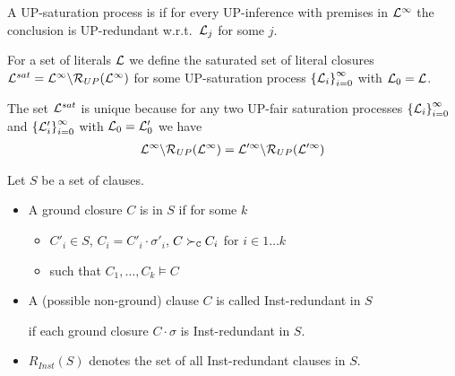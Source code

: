    \begin{definition}[UP-Fairness]

            A UP-saturation process is  if for every UP-inference
            with premises in \( \mathcal{L}^\infty \) the conclusion is UP-redundant
            w.r.t.~\( \mathcal{L}_j \) for some \( j \).
   \end{definition}
   \begin{definition}

            For a set of literals \( \mathcal{L} \) we define
            the saturated set of literal closures
           \( \mathcal{L}^{sat} = \mathcal{L}^\infty\backslash\mathcal{R}_{UP}(\mathcal{L}^\infty) \)
            for some UP-saturation process
           \( {\{ \mathcal{L}_i \}}_{i=0}^\infty \)
            with \( \mathcal{L}_0 = \mathcal{L} \).
   \end{definition}


       \begin{lemma}
        The set \( \mathcal{L}^{sat} \) is unique because
        for any two UP-fair saturation processes
        \( {\{ \mathcal{L}_i \}}_{i=0}^\infty \) and
        \( {\{ \mathcal{L}'_i \}}_{i=0}^\infty \)
        with \( \mathcal{L}_0 = \mathcal{L}'_0 \) we have
        \begin{gather*}
            \mathcal{L}^\infty \backslash \mathcal{R}_{UP}(\mathcal{L}^\infty)
            =
            \mathcal{L}'^\infty \backslash \mathcal{R}_{UP}(\mathcal{L}'^\infty)
        \end{gather*}
       \end{lemma}

\begin{definition}\label{def:inst:redundant}

    Let \( S \) be a set of clauses.

   \begin{itemize}
       \item A ground closure \( C \) is  in \( S \)
        if for some \( k \)
       \begin{itemize}
           \item \( C'_i\in S \), \( C_i=C'_i\cdot\sigma'_i \), \( C\mathrel\succ_{\mathtt{C}} C_i \) \hfill for \( i\in 1\ldots k \)
           \item such that \( C_1,\ldots,C_k\models C \)
       \end{itemize}

       \item
        A (possible non-ground) clause \( C \) is called Inst-redundant in \( S \)

    if each ground closure \( C\cdot\sigma \) is Inst-redundant in \( S \).


   \item
   \( R_{Inst}(S) \) denotes the set of all Inst-redundant clauses in \( S \).


   \end{itemize}

\end{definition}

